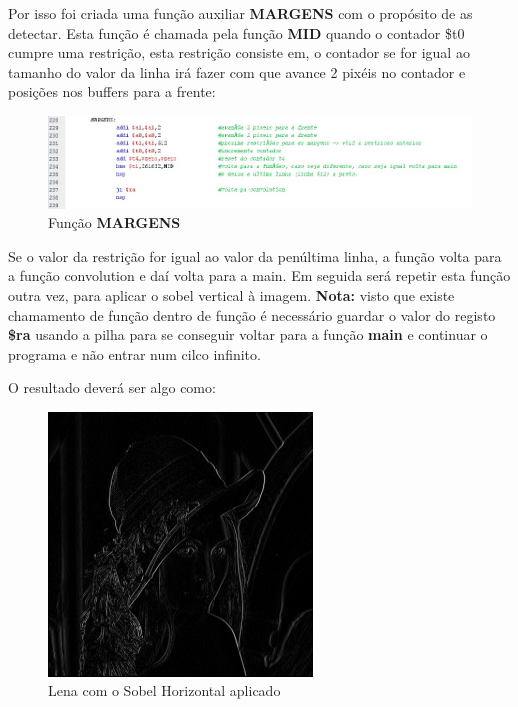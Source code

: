 \documentclass[a4paper,11pt]{article}
\begin{document}
Por isso foi criada uma função auxiliar {\bf MARGENS} com o propósito de as detectar. Esta função é chamada pela função {\bf MID} quando o contador \$t0 cumpre uma restrição, esta restrição consiste em, o contador se for igual ao tamanho do valor da linha irá fazer com que avance 2 pixéis no contador e posições nos buffers para a frente:

\begin{figure}[ht!]
\centering
\includegraphics[width=150mm]{imagem3}
\caption{Função {\bf MARGENS}}
\label{overflow}
\end{figure}

Se o valor da restrição for igual ao valor da penúltima linha, a função volta para a função convolution e daí volta para a main.
Em seguida será repetir esta função outra vez, para aplicar o sobel vertical à imagem.
\newline
\newline
{\bf Nota:} visto que existe chamamento de função dentro de função é necessário guardar o valor do registo {\bf \$ra} usando a pilha para se conseguir voltar para a função {\bf main} e continuar o programa e não entrar num cilco infinito.

\newpage

O resultado deverá ser algo como:

\begin{figure}[ht!]
\centering
\includegraphics[width=70mm]{Lena(SHorizontal)}
\caption{Lena com o Sobel Horizontal aplicado}
\label{overflow}
\end{figure}
\end{document}
